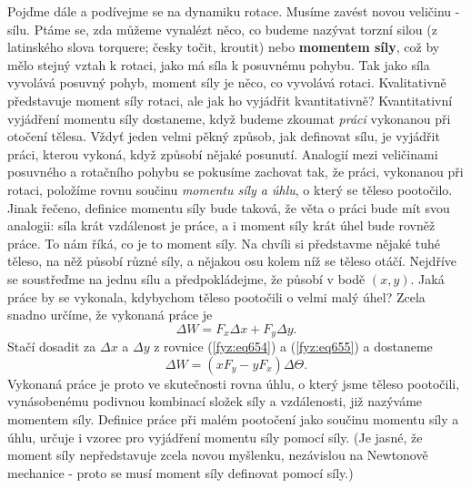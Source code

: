     Pojďme dále a podívejme se na dynamiku rotace. Musíme zavést novou veličinu - sílu. Ptáme se,
    zda můžeme vynalézt něco, co budeme nazývat torzní silou (z latinského slova torquere; česky
    točit, kroutit) nebo \textbf{momentem síly}, což by mělo stejný vztah k rotaci, jako má síla k
    posuvnému pohybu. Tak jako síla vyvolává posuvný pohyb, moment síly je něco, co vyvolává rotaci.
    Kvalitativně představuje moment síly rotaci, ale jak ho vyjádřit kvantitativně? Kvantitativní
    vyjádření momentu síly dostaneme, když budeme zkoumat \emph{práci} vykonanou při otočení tělesa.
    Vždyť jeden velmi pěkný způsob, jak deﬁnovat sílu, je vyjádřit práci, kterou vykoná, když
    způsobí nějaké posunutí. Analogií mezi veličinami posuvného a rotačního pohybu se pokusíme
    zachovat tak, že práci, vykonanou při rotaci, položíme rovnu součinu \emph{momentu síly a úhlu},
    o který se těleso pootočilo. Jinak řečeno, deﬁnice momentu síly bude taková, že věta o práci
    bude mít svou analogii: síla krát vzdálenost je práce, a i moment síly krát úhel bude rovněž
    práce. To nám říká, co je to moment síly. Na chvíli si představme nějaké tuhé těleso, na něž
    působí různé síly, a nějakou osu kolem níž se těleso otáčí. Nejdříve se soustřeďme na jednu sílu
    a předpokládejme, že působí v bodě \((x, y)\). Jaká práce by se vykonala, kdybychom těleso
    pootočili o velmi malý úhel? Zcela snadno určíme, že vykonaná práce je
    \begin{equation}\label{fyz:eq658}
      ΔW=F_xΔx+F_yΔy.
    \end{equation}
    Stačí dosadit za \(Δx\) a \(Δy\) z rovnice (\ref{fyz:eq654}) a (\ref{fyz:eq655}) a dostaneme
    \begin{equation}\label{fyz:eq659}
      ΔW=(xF_y−yF_x)Δ\varTheta.
    \end{equation}
    Vykonaná práce je proto ve skutečnosti rovna úhlu, o který jsme těleso pootočili, vynásobenému
    podivnou kombinací složek síly a vzdálenosti, již nazýváme momentem síly. Deﬁnice práce při
    malém pootočení jako součinu momentu síly a úhlu, určuje i vzorec pro vyjádření momentu síly
    pomocí síly. (Je jasné, že moment síly nepředstavuje zcela novou myšlenku, nezávislou na
    Newtonově mechanice - proto se musí moment síly deﬁnovat pomocí síly.)

